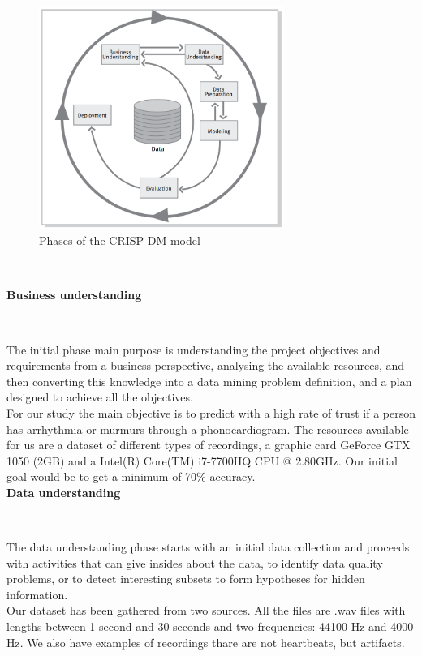 \documentclass[11pt, a4papper]{report}
\theoremstyle{plain}
\theoremstyle{definition}
\theoremstyle{definition}
\theoremstyle{proposition}
\begin{document}
\begin{figure}[h]
\includegraphics[width=8cm]{crisp.png}
\centering
\caption{Phases of the CRISP-DM model}
\end{figure}
\


\textbf{Business understanding}

\

The initial phase main purpose is understanding the project objectives and requirements from a business perspective, analysing the available resources, and then converting this knowledge into a data mining problem definition, and a plan designed to achieve all the objectives. 
\\

For our study the main objective is to predict with a high rate of trust if a person has arrhythmia or murmurs through a phonocardiogram. The resources available for us are a dataset of different types of recordings, a graphic card GeForce GTX 1050 (2GB) and a Intel(R) Core(TM) i7-7700HQ CPU @ 2.80GHz. Our initial goal would be to get a minimum of 70\% accuracy.
\\

\textbf{Data understanding}

\

The data understanding phase starts with an initial data collection and proceeds with activities that can give insides about the data, to identify data quality problems, or to detect interesting subsets to form hypotheses for hidden information.
\\

Our dataset has been gathered from two sources. All the files are .wav files with lengths between 1 second and 30 seconds and two frequencies: 44100 Hz and 4000 Hz. We also have examples of recordings thare are not heartbeats, but artifacts.
\\
\end{document}
